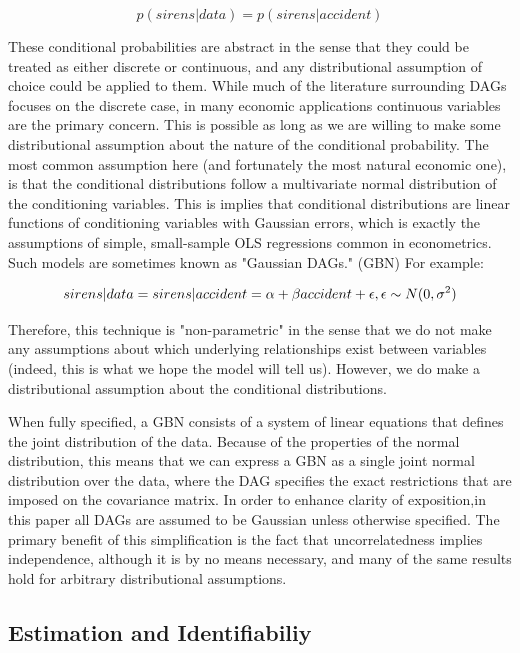 \documentclass{article}
\begin{document}
\begin{equation}
  \label{eq1}
  p(sirens | data) = p(sirens | accident)
\end{equation}

These conditional probabilities are abstract in the sense that they could be treated as either discrete or continuous, and any distributional assumption of choice could be applied to them. While much of the literature surrounding DAGs focuses on the discrete case, in many economic applications continuous variables are the primary concern. This is possible as long as we are willing to make some distributional assumption about the nature of the conditional probability. The most common assumption here (and fortunately the most natural economic one), is that the conditional distributions follow a multivariate normal distribution of the conditioning variables. This is implies that conditional distributions are linear functions of conditioning variables with Gaussian errors, which is exactly the assumptions of simple, small-sample OLS regressions common in econometrics. Such models are sometimes known as "Gaussian DAGs." (GBN) For example:

\begin{equation}
  \label{eq2}
  sirens|data = sirens|accident = \alpha + \beta accident + \epsilon, \space \epsilon \sim N(0, \sigma^2)
\end{equation}

Therefore, this technique is "non-parametric" in the sense that we do not make any assumptions about which underlying relationships exist between variables (indeed, this is what we hope the model will tell us). However, we do make a distributional assumption about the conditional distributions.

When fully specified, a GBN consists of a system of linear equations that defines the joint distribution of the data. Because of the properties of the normal distribution, this means that we can express a GBN as a single joint normal distribution over the data, where the DAG specifies the exact restrictions that are imposed on the covariance matrix. In order to enhance clarity of exposition,in this paper all DAGs are assumed to be Gaussian unless otherwise specified. The primary benefit of this simplification is the fact that uncorrelatedness implies independence, although it is by no means necessary, and many of the same results hold for arbitrary distributional assumptions.

\subsection{Estimation and Identifiabiliy}
\end{document}
